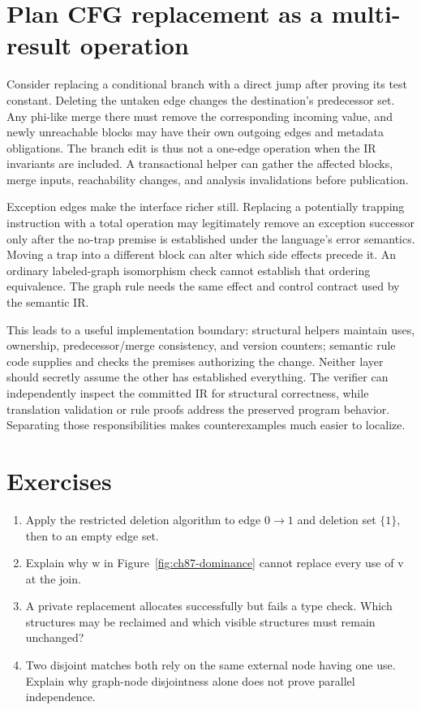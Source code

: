 \section{Plan CFG replacement as a multi-result operation}
\label{sec:ch87-control}
Consider replacing a conditional branch with a direct jump after proving its test constant.
Deleting the untaken edge changes the destination's predecessor set.
Any phi-like merge there must remove the corresponding incoming value, and newly unreachable blocks may have their own outgoing edges and metadata obligations.
The branch edit is thus not a one-edge operation when the IR invariants are included.
A transactional helper can gather the affected blocks, merge inputs, reachability changes, and analysis invalidations before publication.

Exception edges make the interface richer still.
Replacing a potentially trapping instruction with a total operation may legitimately remove an exception successor only after the no-trap premise is established under the language's error semantics.
Moving a trap into a different block can alter which side effects precede it.
An ordinary labeled-graph isomorphism check cannot establish that ordering equivalence.
The graph rule needs the same effect and control contract used by the semantic IR.

This leads to a useful implementation boundary: structural helpers maintain uses, ownership, predecessor/merge consistency, and version counters; semantic rule code supplies and checks the premises authorizing the change.
Neither layer should secretly assume the other has established everything.
The verifier can independently inspect the committed IR for structural correctness, while translation validation or rule proofs address the preserved program behavior.
Separating those responsibilities makes counterexamples much easier to localize.

\section{Exercises}
\label{sec:ch87-exercises}
\begin{enumerate}
\item\label{ex:ch87-dangle} Apply the restricted deletion algorithm to edge $0\to1$ and deletion set $\{1\}$, then to an empty edge set.
\item\label{ex:ch87-dominate} Explain why w in Figure~\ref{fig:ch87-dominance} cannot replace every use of v at the join.
\item\label{ex:ch87-rollback} A private replacement allocates successfully but fails a type check.
Which structures may be reclaimed and which visible structures must remain unchanged?
\item\label{ex:ch87-conflict} Two disjoint matches both rely on the same external node having one use.
Explain why graph-node disjointness alone does not prove parallel independence.
\end{enumerate}

